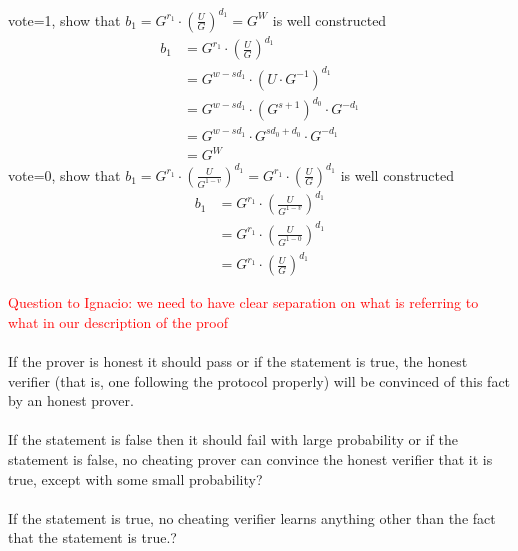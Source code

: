 \begin{infobox}[Explanation of \begin{math}b_1= G^{r_1}  \cdot (\frac{U}{G})^{d_1}\end{math}]
vote=1, show that \begin{math}b_1= G^{r_1}  \cdot (\frac{U}{G})^{d_1} = G^W\end{math} is well constructed \begin{align*}
    b_1 &= G^{r_1}  \cdot (\frac{U}{G})^{d_1}                   \\
        &= G^{w-sd_1} \cdot (U \cdot G^{-1})^{d_1}              \\
        &= G^{w-sd_1} \cdot  (G^{s+1})^{d_0} \cdot G^{-d_1}     \\
        &= G^{w-sd_1} \cdot  G^{sd_0+d_0} \cdot G^{-d_1}        \\
        &= G^W
\end{align*}
vote=0, show that  \begin{math}b_1= G^{r_1}  \cdot (\frac{U}{G^{1-v}})^{d_1} = G^{r_1}  \cdot (\frac{U}{G})^{d_1}\end{math} is well constructed
\begin{align*}
    b_1 &= G^{r_1}  \cdot (\frac{U}{G^{1-v}})^{d_1}             \\ 
        &= G^{r_1}  \cdot (\frac{U}{G^{1-0}})^{d_1}             \\
        &= G^{r_1}  \cdot (\frac{U}{G})^{d_1}
\end{align*}
\end{infobox}



\begin{infobox}
\textcolor{red}{Question to Ignacio: we need to have clear separation on what is referring to what in our description of the proof}\\\\
 If the prover is honest it should pass or if the statement is true, the honest verifier (that is, one following the protocol properly)
will be convinced of this fact by an honest prover.\\\\
If the statement is false then it should fail with large probability or if the statement is false, no cheating prover can convince
the honest verifier that it is true, except with some small probability?\\\\
 If the statement is true, no cheating verifier learns anything other than the fact that the statement is true.?
\end{infobox}

